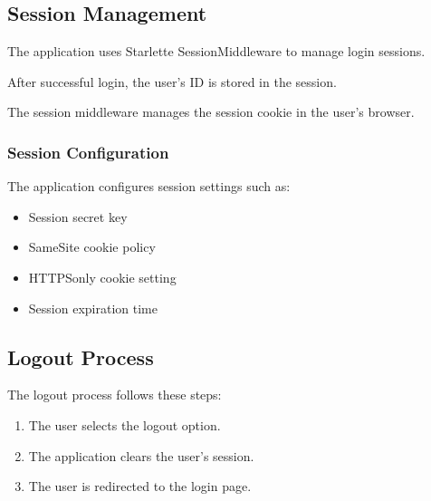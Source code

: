 \documentclass[letterpaper,10pt,english]{sphinxmanual}
\begin{document}
\subsection{Session Management}
\label{\detokenize{authentication:session-management}}
\sphinxAtStartPar
The application uses Starlette SessionMiddleware to manage login sessions.

\sphinxAtStartPar
After successful login, the user’s ID is stored in the session.

\sphinxAtStartPar
The session middleware manages the session cookie in the user’s browser.


\subsubsection{Session Configuration}
\label{\detokenize{authentication:session-configuration}}
\sphinxAtStartPar
The application configures session settings such as:
\begin{itemize}
\item {} 
\sphinxAtStartPar
Session secret key

\item {} 
\sphinxAtStartPar
SameSite cookie policy

\item {} 
\sphinxAtStartPar
HTTPS\sphinxhyphen{}only cookie setting

\item {} 
\sphinxAtStartPar
Session expiration time

\end{itemize}


\subsection{Logout Process}
\label{\detokenize{authentication:logout-process}}
\sphinxAtStartPar
The logout process follows these steps:
\begin{enumerate}
%
\item {} 
\sphinxAtStartPar
The user selects the logout option.

\item {} 
\sphinxAtStartPar
The application clears the user’s session.

\item {} 
\sphinxAtStartPar
The user is redirected to the login page.

\end{enumerate}
\end{document}
